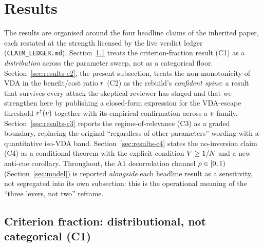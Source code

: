 %
%

\section{Results}
\label{sec:results}

The results are organised around the four headline claims of the
inherited paper, each restated at the strength licensed by the live
verdict ledger (\texttt{CLAIM\_LEDGER.md}). Section~\ref{sec:results-c1}
treats the criterion-fraction result (C1) as a \emph{distribution}
across the parameter sweep, not as a categorical floor.
Section~\ref{sec:results-c2}, the present subsection, treats the
non-monotonicity of VDA in the benefit/cost ratio $r$ (C2) as the
rebuild's \emph{confident spine}: a result that survives every attack
the skeptical reviewer has staged and that we strengthen here by
publishing a closed-form expression for the VDA-escape threshold
$r^{\dagger}(v)$ together with its empirical confirmation across a
$v$-family. Section~\ref{sec:results-c3} reports the
regime-of-relevance (C3) as a graded boundary, replacing the original
``regardless of other parameters'' wording with a quantitative
iso-VDA band. Section~\ref{sec:results-c4} states the no-inversion
claim (C4) as a conditional theorem with the explicit condition
$V \ge 1/N$ and a new anti-cue corollary. Throughout, the
A1 decorrelation channel $\rho \in [0, 1)$
(Section~\ref{sec:model}) is reported \emph{alongside} each headline
result as a sensitivity, not segregated into its own subsection:
this is the operational meaning of the ``three levers, not two''
reframe.

\subsection{Criterion fraction: distributional, not categorical (C1)}
\label{sec:results-c1}

